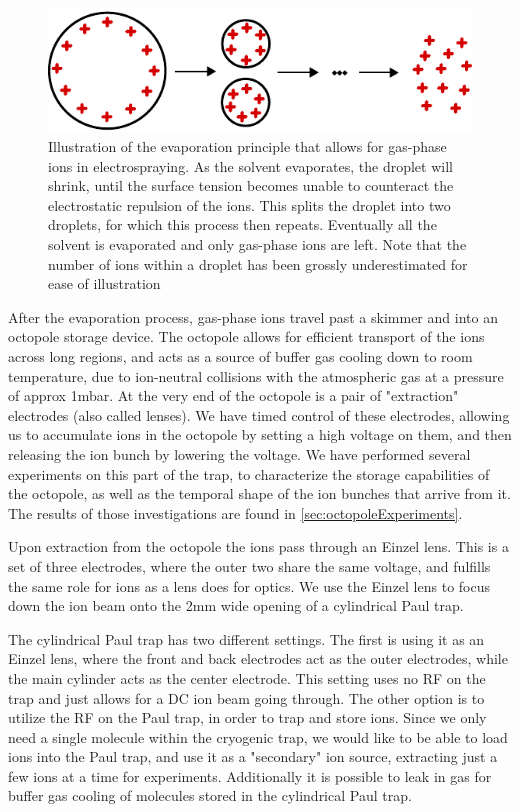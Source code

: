 \begin{figure}
    \centering
    \includegraphics{main/evaporation.pdf}
    \caption{Illustration of the evaporation principle that allows for gas-phase ions in electrospraying. As the solvent evaporates, the droplet will shrink, until the surface tension becomes unable to counteract the electrostatic repulsion of the ions. This splits the droplet into two droplets, for which this process then repeats. Eventually all the solvent is evaporated and only gas-phase ions are left. Note that the number of ions within a droplet has been grossly underestimated for ease of illustration}
    \label{fig:evaporation}
\end{figure}

After the evaporation process, gas-phase ions travel past a skimmer and into an octopole storage device. The octopole allows for efficient transport of the ions across long regions, and acts as a source of buffer gas cooling down to room temperature, due to ion-neutral collisions with the atmospheric gas at a pressure of approx 1mbar. At the very end of the octopole is a pair of "extraction" electrodes (also called lenses). We have timed control of these electrodes, allowing us to accumulate ions in the octopole by setting a high voltage on them, and then releasing the ion bunch by lowering the voltage. We have performed several experiments on this part of the trap, to characterize the storage capabilities of the octopole, as well as the temporal shape of the ion bunches that arrive from it. The results of those investigations are found in \cref{sec:octopoleExperiments}.

Upon extraction from the octopole the ions pass through an Einzel lens. This is a set of three electrodes, where the outer two share the same voltage, and fulfills the same role for ions as a lens does for optics. We use the Einzel lens to focus down the ion beam onto the 2mm wide opening of a cylindrical Paul trap.

The cylindrical Paul trap has two different settings. The first is using it as an Einzel lens, where the front and back electrodes act as the outer electrodes, while the main cylinder acts as the center electrode. This setting uses no RF on the trap and just allows for a DC ion beam going through.
The other option is to utilize the RF on the Paul trap, in order to trap and store ions. Since we only need a single molecule within the cryogenic trap, we would like to be able to load ions into the Paul trap, and use it as a "secondary" ion source, extracting just a few ions at a time for experiments.
Additionally it is possible to leak in gas for buffer gas cooling of molecules stored in the cylindrical Paul trap.

